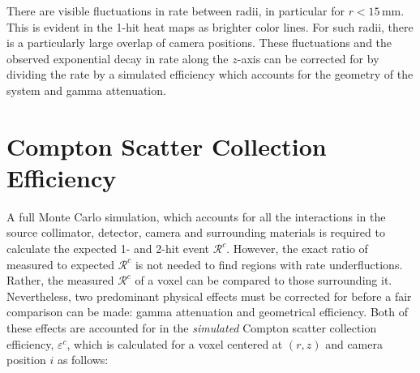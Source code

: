 There are visible fluctuations in rate between radii, in particular for $r < 15$\,mm. This is evident in the 1-hit heat maps as brighter color lines. For such radii, there is a particularly large overlap of camera positions. These fluctuations and the observed exponential decay in rate along the $z$-axis can be corrected for by dividing the rate by a simulated efficiency which accounts for the geometry of the system and gamma attenuation. 

\section{Compton Scatter Collection Efficiency}

A full Monte Carlo simulation, which accounts for all the interactions in the source collimator, detector, camera and surrounding materials is required to calculate the expected 1- and 2-hit event $\mathcal{R}^c$. However, the exact ratio of measured to expected $\mathcal{R}^c$ is not needed to find regions with rate underfluctions. Rather, the measured $\mathcal{R}^c$ of a voxel can be compared to those surrounding it. Nevertheless, two predominant physical effects must be corrected for before a fair comparison can be made: gamma attenuation and geometrical efficiency. Both of these effects are accounted for in the \textit{simulated} Compton scatter collection efficiency, $\varepsilon^c$, which is calculated for a voxel centered at $(r,z)$ and camera position $i$ as follows:
